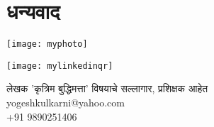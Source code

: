 \chapter*{धन्यवाद }

\begin{minipage}[T]{0.5\textwidth}
    \centering
    \texttt{[image: myphoto]}
\end{minipage}%
\begin{minipage}[T]{0.5\textwidth}
	\centering
    \texttt{[image: mylinkedinqr]}
	
	लेखक 'कृत्रिम बुद्धिमत्ता' विषयाचे सल्लागार, प्रशिक्षक आहेत \\
	yogeshkulkarni@yahoo.com \\
	+91 9890251406
\end{minipage}
  

